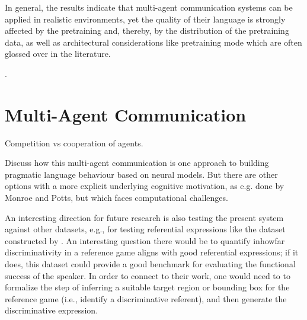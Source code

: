 In general, the results indicate that multi-agent communication systems can be applied in realistic environments, yet the quality of their language is strongly affected by the pretraining and, thereby, by the distribution of the pretraining data, as well as architectural considerations like pretraining mode which are often glossed over in the literature.


. 

\section{Multi-Agent Communication}

Competition vs cooperation of agents. 

Discuss how this multi-agent communication is one approach to building pragmatic language behaviour based on neural models. But there are other options with a more explicit underlying cognitive motivation, as e.g. done by Monroe and Potts, but which faces computational challenges. 


An interesting direction for future research is also testing the present system against other datasets, e.g., for testing referential expressions like the dataset constructed by \cite{mao2016generation}. An interesting question there would be to quantify inhowfar discriminativity in a reference game aligns with good referential expressions; if it does, this dataset could provide a good benchmark for evaluating the functional success of the speaker. In order to connect to their work, one would need to to formalize the step of inferring a suitable target region or bounding box for the reference game (i.e., identify a discriminative referent), and then generate the discriminative expression. 

